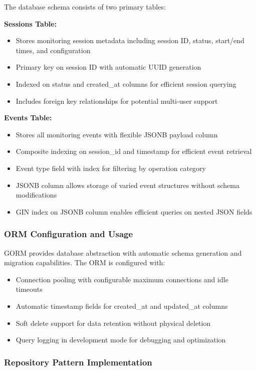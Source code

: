 The database schema consists of two primary tables:

\textbf{Sessions Table:}
\begin{itemize}
    \item Stores monitoring session metadata including session ID, status, start/end times, and configuration
    \item Primary key on session ID with automatic UUID generation
    \item Indexed on status and created\_at columns for efficient session querying
    \item Includes foreign key relationships for potential multi-user support
\end{itemize}

\textbf{Events Table:}
\begin{itemize}
    \item Stores all monitoring events with flexible JSONB payload column
    \item Composite indexing on session\_id and timestamp for efficient event retrieval
    \item Event type field with index for filtering by operation category
    \item JSONB column allows storage of varied event structures without schema modifications
    \item GIN index on JSONB column enables efficient queries on nested JSON fields
\end{itemize}

\subsubsection{ORM Configuration and Usage}

GORM provides database abstraction with automatic schema generation and migration capabilities. The ORM is configured with:

\begin{itemize}
    \item Connection pooling with configurable maximum connections and idle timeouts
    \item Automatic timestamp fields for created\_at and updated\_at columns
    \item Soft delete support for data retention without physical deletion
    \item Query logging in development mode for debugging and optimization
\end{itemize}

\subsubsection{Repository Pattern Implementation}

